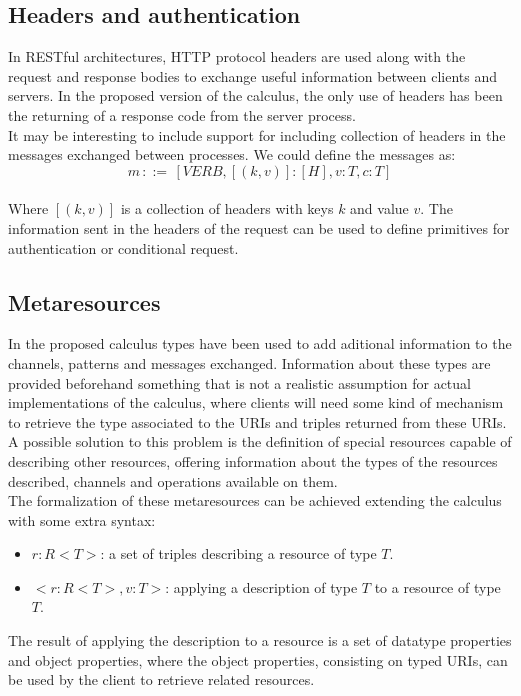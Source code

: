 \subsection{Headers and authentication}
In RESTful architectures, HTTP protocol headers are used along with the request and response bodies to exchange useful information between clients and servers. In the proposed version of the calculus, the only use of headers has been the returning of a response code from the server process.\\
It may be interesting to include support for including collection of headers in the messages exchanged between processes. We could define the messages as:\\
\begin{equation*}
m\,::=\,[VERB,[(k,v)]:[H],v:T,c:T]
\end{equation*}
\\Where $[(k,v)]$ is a collection of headers with keys $k$ and value $v$. The information sent in the headers of the request can be used to define primitives for authentication or conditional request.

\subsection{Metaresources}
In the proposed calculus types have been used to add aditional information to the channels, patterns and messages exchanged. Information about these types are provided beforehand something that is not a realistic assumption for actual implementations of the calculus, where clients will need some kind of mechanism to retrieve the type associated to the URIs and triples returned from these URIs. A possible solution to this problem is the definition of special resources capable of describing other resources, offering information about the types of the resources described, channels and operations available on them.\\
The formalization of these metaresources can be achieved extending the calculus with some extra syntax:
\begin{itemize}
  \item $r:R<T>$: a set of triples describing a resource of type $T$.
  \item $<r:R<T>,v:T>$: applying a description of type $T$ to a resource of type $T$.
\end{itemize}
The result of applying the description to a resource is a set of datatype properties and object properties, where the object properties, consisting on typed URIs, can be used by the client to retrieve related resources.

